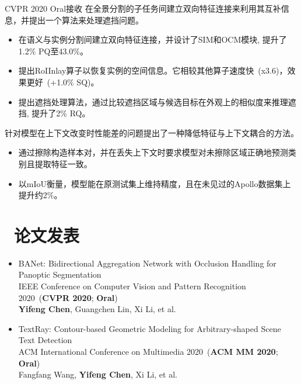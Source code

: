 \documentclass{resume}
\begin{document}
	 {CVPR 2020 Oral接收}
	在全景分割的子任务间建立双向特征连接来利用其互补信息，并提出一个算法来处理遮挡问题。
	\vspace{-0.2em}
	\begin{itemize}
		\item 在语义与实例分割间建立双向特征连接，并设计了SIM和OCM模块, 提升了1.2\% PQ至43.0\%。
		\item 提出RoIInlay算子以恢复实例的空间信息。它相较其他算子速度快~(x3.6)，效果更好~(+1.0\% SQ)。
		\item 提出遮挡处理算法，通过比较遮挡区域与候选目标在外观上的相似度来推理遮挡, 提升了2\% RQ。
	\end{itemize}
	\vspace{-0.25em}
	
	 {}
	针对模型在上下文改变时性能差的问题提出了一种降低特征与上下文耦合的方法。
	\vspace{-0.2em}
	\begin{itemize}
		\item 通过擦除构造样本对，并在丢失上下文时要求模型对未擦除区域正确地预测类别且提取特征一致。
		\item 以mIoU衡量，模型能在原测试集上维持精度，且在未见过的Apollo数据集上提升约2\%。
	\end{itemize}
	\vspace{-0.5em}
	
	\section{\faFileTextO\ 论文发表}
	\begin{itemize}
		\small
		\item BANet: Bidirectional Aggregation Network with Occlusion Handling for Panoptic Segmentation \\
		IEEE Conference on Computer Vision and Pattern Recognition 2020~(\textbf{CVPR 2020}; \textbf{Oral}) \\
		\textbf{Yifeng Chen}, Guangchen Lin, Xi Li, et al. 
		\item TextRay: Contour-based Geometric Modeling for Arbitrary-shaped Scene Text Detection \\
		ACM International Conference on Multimedia 2020~(\textbf{ACM MM 2020}; \textbf{Oral})\\
		Fangfang Wang, \textbf{Yifeng Chen}, Xi Li, et al. 
	\end{itemize}
	\vspace{-0.5em}	
\end{document}
